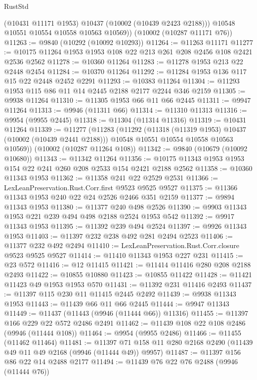 \begin{lexlean}{RustStd}
\begin{coremodule}
          (@10431 @11171 @1953)
          @10437
          (@10002 (@10439 @2423 @2188)))
        @10548
        @10551
        @10554
        @10558
        @10563
        @10569))
    (@10002 (@10287 @11171 @76))
@11263 := @9840 (@10292 (@10092 @10293))
@11264 := @11263 @11171
@11277 := @10175 @11264 @1953 @1953 @108 @22 @213 @261 @208 @2456 @108 @2421 @2536 @2562
@11278 := @10360 @11264
@11283 := @11278 @1953 @213 @22 @2448 @2454
@11284 := @10370 @11264
@11292 := @11284 @1953 @136 @117 @15 @22 @2448 @2452 @2291
@11293 := @10383 @11264
@11304 := @11293 @1953 @115 @86 @11 @14 @2445 @2188 @2177 @2244 @346 @2159
@11305 := @9938 @11264
@11310 := @11305 @1953 @66 @11 @66 @2445
@11311 := @9947 @11264
@11313 := @9946 (@11311 @66)
@11314 := @11310 @11313
@11316 := @9954 (@9955 @2445)
@11318 := @11304 (@11314 @11316)
@11319 := @10431 @11264
@11339 := @11277
    (@11283
      (@11292
        (@11318 (@11319 @1953) @10437 (@10002 (@10439 @2441 @2188)))
        @10548
        @10551
        @10554
        @10558
        @10563
        @10569))
    (@10002 (@10287 @11264 @108))
@11342 := @9840 (@10679 (@10092 @10680))
@11343 := @11342 @11264
@11356 := @10175 @11343 @1953 @1953 @154 @22 @241 @260 @208 @2533 @154 @2421 @2188 @2562
@11358 := @10360 @11343 @1953
@11362 := @11358 @241 @22 @2529 @2531
@11366 := LexLeanPreservation.Rust.Corr.first @9523 @9525 @9527
@11375 := @11366 @11343 @1953 @240 @22 @24 @2526 @2466 @351 @2159
@11377 := @9894 @11343 @1953
@11380 := @11377 @240 @498 @2526
@11390 := @9903 @11343 @1953 @221 @239 @494 @498 @2188 @2524 @1953 @542
@11392 := @9917 @11343 @1953
@11395 := @11392 @239 @494 @2524
@11397 := @9926 @11343 @1953
@11403 := @11397 @232 @238 @492 @281 @2494 @2523
@11406 := @11377 @232 @492 @2494
@11410 := LexLeanPreservation.Rust.Corr.closure @9523 @9525 @9527
@11414 := @11410 @11343 @1953 @227 @231
@11415 := @23 @572
@11416 := @12 @11415
@11421 := @11414 @11416 @280 @208 @2188 @2493
@11422 := @10855 @10880
@11423 := @10855 @11422
@11428 := @11421 @11423 @49 @1953 @1953 @570
@11431 := @11392 @231 @11416 @2493
@11437 := @11397 @115 @230 @11 @11415 @2445 @2492
@11439 := @9938 @11343 @1953
@11443 := @11439 @66 @11 @66 @2445
@11444 := @9947 @11343
@11449 := @11437 (@11443 (@9946 (@11444 @66)) @11316)
@11455 := @11397 @166 @229 @22 @572 @2486 @2491
@11462 := @11439 @108 @22 @108 @2486 (@9946 (@11444 @108))
@11464 := @9954 (@9955 @2486)
@11466 := @11455 (@11462 @11464)
@11481 := @11397 @71 @158 @11 @280 @2168 @2490 (@11439 @49 @11 @49 @2168 (@9946 (@11444 @49)) @9957)
@11487 := @11397 @156 @86 @22 @14 @2488 @2177
@11494 := @11439 @76 @22 @76 @2488 (@9946 (@11444 @76))

\end{coremodule}
\end{lexlean}
